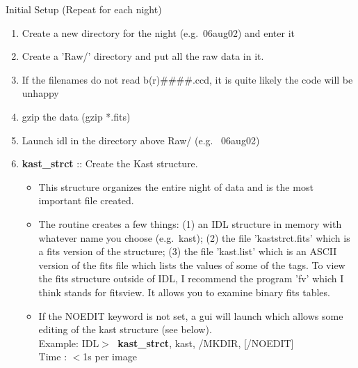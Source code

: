 \documentclass[11pt,letterpaper,dvips]{article}
\begin{document}
\begin{enumerate}
{\Large  \item Initial Setup (Repeat for each night) }

  \begin{enumerate}

    \item Create a new directory for the night (e.g.\ 06aug02) and enter it
    \item Create a 'Raw/' directory and put all the raw data in it.  
    \item If the filenames do not read b(r)\#\#\#\#.ccd, it is quite likely
	the code will be unhappy
    \item gzip the data (gzip *.fits)
    \item Launch idl in the directory above Raw/ (e.g. \ 06aug02)
    \item {\bf kast\_strct} :: Create the Kast structure.  
	\begin{itemize}
	\item This structure organizes
	the entire night of data and is the most important file created.  
	\item The routine creates a few things: (1) an IDL structure in memory with
	whatever name you choose (e.g.\ kast); 
	(2) the file 'kaststrct.fits' which is a fits
	version of the structure; (3) the file 'kast.list' which is an ASCII
	version of the fits file which lists the values of some of the tags.
	To view the fits structure outside of IDL, I 
	recommend the program 'fv' which I think stands for fitsview.  It allows
	you to examine binary fits tables.  
	\item If the NOEDIT keyword is not set, a
	gui will launch which allows some editing of the kast structure 
	(see below). \\
         \quad Example: IDL$> \;$ {\bf kast\_strct}, kast, /MKDIR, [/NOEDIT] \\  
         \quad Time   : $<$1s per image
	\end{itemize}



\end{enumerate}
\end{enumerate}
\end{document}

